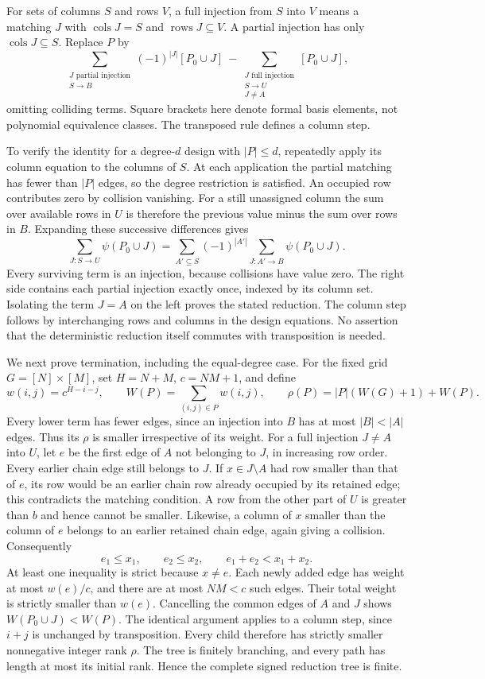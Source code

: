 For sets of columns $S$ and rows $V$, a full injection from $S$ into $V$
means a matching $J$ with $\operatorname{cols}J=S$ and
$\operatorname{rows}J\subseteq V$.  A partial injection has only
$\operatorname{cols}J\subseteq S$.  Replace $P$ by
\[
 \sum_{\substack{J\text{ partial injection}\\S\to B}}
       (-1)^{|J|}[P_0\cup J]
 \ -\!
 \sum_{\substack{J\text{ full injection}\\S\to U\\J\ne A}}
       [P_0\cup J],
\]
omitting colliding terms.  Square brackets here denote formal basis
elements, not polynomial equivalence classes.  The transposed rule defines
a column step.

To verify the identity for a degree-$d$ design with $|P|\leq d$, repeatedly
apply its column equation to the columns of $S$.  At each application
the partial matching has fewer than $|P|$ edges, so the degree restriction
is satisfied.  An occupied row contributes zero by collision vanishing.
For a still unassigned column the sum over available rows in $U$ is
therefore the previous value minus the sum over rows in $B$.  Expanding
these successive differences gives
\[
 \sum_{J:S\to U}\psi(P_0\cup J)
  =\sum_{A'\subseteq S}(-1)^{|A'|}
       \sum_{J:A'\to B}\psi(P_0\cup J).
\]
Every surviving term is an injection, because collisions have value zero.
The right side contains each partial injection exactly once, indexed by
its column set.  Isolating the term $J=A$ on the left proves the stated
reduction.  The column step follows by interchanging rows and columns in
the design equations.  No assertion that the deterministic reduction
itself commutes with transposition is needed.

We next prove termination, including the equal-degree case.  For the
fixed grid $G=[N]\times[M]$, set $H=N+M$, $c=NM+1$, and define
\[
 w(i,j)=c^{H-i-j},\qquad W(P)=\sum_{(i,j)\in P}w(i,j),\qquad
 \rho(P)=|P|(W(G)+1)+W(P).
\]
Every lower term has fewer edges, since an injection into $B$ has at most
$|B|<|A|$ edges.  Thus its $\rho$ is smaller irrespective of its weight.
For a full injection $J\ne A$ into $U$, let $e$ be the first edge of $A$
not belonging to $J$, in increasing row order.  Every earlier chain edge
still belongs to $J$.  If $x\in J\setminus A$ had row smaller than that
of $e$, its row would be an earlier chain row already occupied by its
retained edge; this contradicts the matching condition.  A row from the
other part of $U$ is greater than $b$ and hence cannot be smaller.
Likewise, a column of $x$ smaller than the column of $e$ belongs to an
earlier retained chain edge, again giving a collision.  Consequently
\[
 e_1\leq x_1,\qquad e_2\leq x_2,\qquad e_1+e_2<x_1+x_2.
\]
At least one inequality is strict because $x\ne e$.  Each newly added
edge has weight at most $w(e)/c$, and there are at most $NM<c$ such
edges.  Their total weight is strictly smaller than $w(e)$.  Cancelling
the common edges of $A$ and $J$ shows $W(P_0\cup J)<W(P)$.
The identical argument applies to a column step, since $i+j$ is
unchanged by transposition.  Every child therefore has strictly smaller
nonnegative integer rank $\rho$.  The tree is finitely branching, and
every path has length at most its initial rank.  Hence the complete
signed reduction tree is finite.

